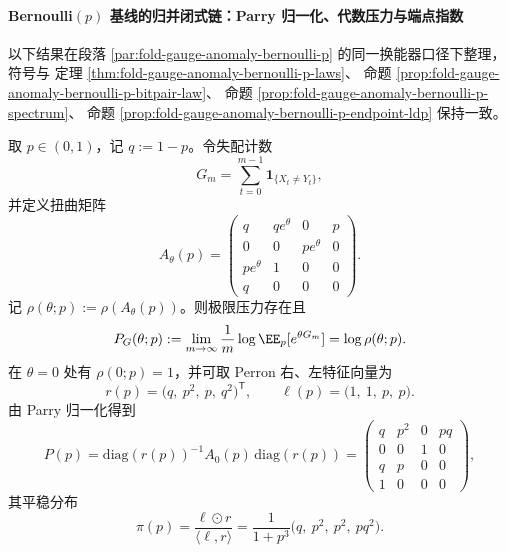 \paragraph{Bernoulli\texorpdfstring{$(p)$}{(p)} 基线的归并闭式链：Parry 归一化、代数压力与端点指数}
以下结果在段落 \ref{par:fold-gauge-anomaly-bernoulli-p} 的同一换能器口径下整理，符号与
定理 \ref{thm:fold-gauge-anomaly-bernoulli-p-laws}、
命题 \ref{prop:fold-gauge-anomaly-bernoulli-p-bitpair-law}、
命题 \ref{prop:fold-gauge-anomaly-bernoulli-p-spectrum}、
命题 \ref{prop:fold-gauge-anomaly-bernoulli-p-endpoint-ldp}
保持一致。

\begin{theorem}\label{thm:fold-bernoulli-p-parry-pressure-chain}
取 \(p\in(0,1)\)，记 \(q:=1-p\)。令失配计数
\[
G_m=\sum_{t=0}^{m-1}\mathbf 1_{\{X_t\neq Y_t\}},
\]
并定义扭曲矩阵
\begin{equation}\label{eq:fold-bernoulli-p-parry-Atheta}
A_{\theta}(p)=
\begin{pmatrix}
q&q e^\theta&0&p\\
0&0&p e^\theta&0\\
p e^\theta&1&0&0\\
q&0&0&0
\end{pmatrix}.
\end{equation}
记 \(\rho(\theta;p):=\rho(A_\theta(p))\)。则极限压力存在且
\begin{equation}\label{eq:fold-bernoulli-p-parry-pressure}
P_G(\theta;p):=\lim_{m\to\infty}\frac1m\log\EE_p[e^{\theta G_m}]
=\log \rho(\theta;p).
\end{equation}
在 \(\theta=0\) 处有 \(\rho(0;p)=1\)，并可取 Perron 右、左特征向量为
\begin{equation}\label{eq:fold-bernoulli-p-parry-eigenvectors}
r(p)=\bigl(q,\ p^2,\ p,\ q^2\bigr)^{\mathsf T},
\qquad
\ell(p)=\bigl(1,\ 1,\ p,\ p\bigr).
\end{equation}
由 Parry 归一化得到
\begin{equation}\label{eq:fold-bernoulli-p-parry-kernel}
P(p)=\mathrm{diag}(r(p))^{-1}A_0(p)\,\mathrm{diag}(r(p))
=
\begin{pmatrix}
q&p^2&0&pq\\
0&0&1&0\\
q&p&0&0\\
1&0&0&0
\end{pmatrix},
\end{equation}
其平稳分布
\begin{equation}\label{eq:fold-bernoulli-p-parry-stationary}
\pi(p)=\frac{\ell\odot r}{\langle \ell,r\rangle}
=\frac1{1+p^3}\bigl(q,\ p^2,\ p^2,\ p q^2\bigr).
\end{equation}
\end{theorem}

